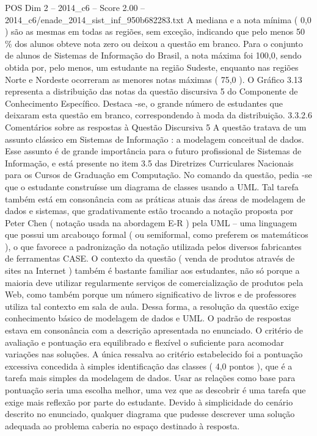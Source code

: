 \begin{textsample}{POS Dim 2 – 2014\_c6 – Score 2.00 – 2014\_c6/enade\_2014\_sist\_inf\_950b682283.txt}
A mediana e a nota mínima ( 0,0 ) são as mesmas em todas as regiões, sem exceção, indicando que pelo menos 50 \% dos alunos obteve nota zero ou deixou a questão em branco.
Para o conjunto de alunos de Sistemas de Informação do Brasil, a nota máxima foi 100,0, sendo obtida por, pelo menos, um estudante na região Sudeste, enquanto nas regiões Norte e Nordeste ocorreram as menores notas máximas ( 75,0 ).
O Gráfico 3.13 representa a distribuição das notas da questão discursiva 5 do Componente de Conhecimento Específico.
Destaca -se, o grande número de estudantes que deixaram esta questão em branco, correspondendo à moda da distribuição. 3.3.2.6 Comentários sobre as respostas à Questão Discursiva 5 A questão tratava de um assunto clássico em Sistemas de Informação : a modelagem conceitual de dados.
Esse assunto é de grande importância para o futuro profissional de Sistemas de Informação, e está presente no item 3.5 das Diretrizes Curriculares Nacionais para os Cursos de Graduação em Computação.
No comando da questão, pedia -se que o estudante construísse um diagrama de classes usando a UML.
Tal tarefa também está em consonância com as práticas atuais das áreas de modelagem de dados e sistemas, que gradativamente estão trocando a notação proposta por Peter Chen ( notação usada na abordagem E-R ) pela UML – uma linguagem que possui um arcabouço formal ( ou semiformal, como preferem os matemáticos ), o que favorece a padronização da notação utilizada pelos diversos fabricantes de ferramentas CASE.
O contexto da questão ( venda de produtos através de sites na Internet ) também é bastante familiar aos estudantes, não só porque a maioria deve utilizar regularmente serviços de comercialização de produtos pela Web, como também porque um número significativo de livros e de professores utiliza tal contexto em sala de aula.
Dessa forma, a resolução da questão exige conhecimento básico de modelagem de dados e UML.
O padrão de respostas estava em consonância com a descrição apresentada no enunciado.
O critério de avaliação e pontuação era equilibrado e flexível o suficiente para acomodar variações nas soluções.
A única ressalva ao critério estabelecido foi a pontuação excessiva concedida à simples identificação das classes ( 4,0 pontos ), que é a tarefa mais simples da modelagem de dados.
Usar as relações como base para pontuação seria uma escolha melhor, uma vez que as descobrir é uma tarefa que exige mais reflexão por parte do estudante.
Devido à simplicidade do cenário descrito no enunciado, qualquer diagrama que pudesse descrever uma solução adequada ao problema caberia no espaço destinado à resposta.

\end{textsample}
